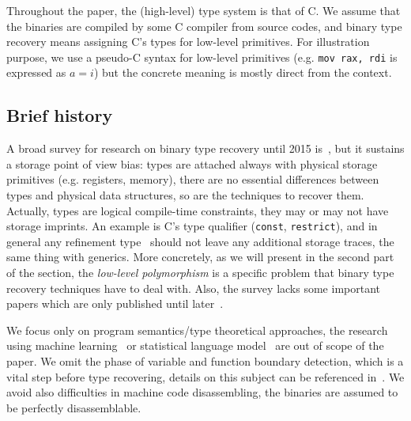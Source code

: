 \documentclass[compsoc,conference,a4paper,10pt,times]{IEEEtran}
\begin{document}
Throughout the paper, the (high-level) type system is that of C. We assume that the binaries are
compiled by some C compiler from source codes, and binary type recovery means assigning C's types for
low-level primitives. For illustration purpose, we use a pseudo-C syntax for low-level primitives
(e.g. \texttt{\small mov rax, rdi} is expressed as $a = i$) but the concrete meaning is mostly direct from the context.

\subsection{Brief history}
\noindent
A broad survey for research on binary type recovery until 2015 is~\cite{caballero_type_2016}, but it sustains a storage point of view bias: types are attached
always with physical storage primitives (e.g. registers, memory), there are no essential differences 
between types and physical data structures, so are the techniques to recover them. Actually, types are 
logical compile-time constraints, they may or may not have storage imprints. An example is C's 
type qualifier (\texttt{\small const}, \texttt{\small restrict}), and in general any
refinement type~\cite{freeman_refinement_1991} should not leave any additional storage traces, the same thing with generics. More concretely, as
we will present in the second part of the section, the \emph{low-level polymorphism} is a specific problem that binary type
recovery techniques have to deal with.
Also, the survey lacks some important
papers which are only published until later~\cite{noonan_polymorphic_2016,robbins_minx_2016}.

We focus only on program semantics/type theoretical approaches, the research using machine learning~\cite{maier_typeminer_2019}
or statistical language model~\cite{katz_estimating_2016} are out of scope of the paper.
We omit the phase of variable and function boundary detection, which is a vital step before
type recovering, details on this subject can be referenced in~\cite{balakrishnan_divine_2007}.
We avoid also difficulties in machine code disassembling, the binaries are assumed to be perfectly disassemblable.

\end{document}
